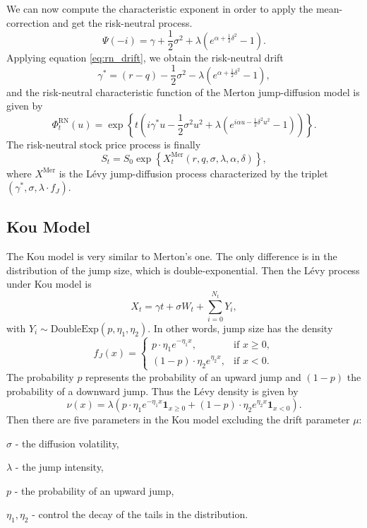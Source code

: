 We can now compute the characteristic exponent in order to apply the mean-correction and get the risk-neutral process.
$$\Psi(-i) = \gamma +\frac{1}{2}\sigma^2 + \lambda\left(e^{\alpha+\frac{1}{2}\delta^2}-1\right).$$
Applying equation \eqref{eq:rn_drift}, we obtain the risk-neutral drift
$$\gamma^\ast = (r-q) -\frac{1}{2}\sigma^2 - \lambda\left(e^{\alpha+\frac{1}{2}\delta^2}-1\right),$$
and the risk-neutral characteristic function of the Merton jump-diffusion model is given by
$$\Phi_t^{\text{RN}}(u) = \exp\left\{t\left(i\gamma^\ast u -\frac{1}{2}\sigma^2 u^2 + \lambda\left(e^{i\alpha u -\frac{1}{2}\delta^2 u^2}-1\right)\right)\right\}.$$
The risk-neutral stock price process is finally
$$S_t = S_0\exp\left\{X_t^\text{Mer}(r,q,\sigma,\lambda,\alpha,\delta)\right\},$$
where $X^\text{Mer}$ is the L\'evy jump-diffusion process characterized by the triplet $(\gamma^\ast,\sigma,\lambda\cdot f_J)$.

\subsection{Kou Model}
The Kou model \citeyearpar{Kou02} is very similar to Merton's one. The only difference is in the distribution of the jump size, which is double-exponential. Then the L\'evy process under Kou model is
$$X_t = \gamma t +\sigma W_t +\sum_{i=0}^{N_t} Y_i,$$
with $Y_i\sim \text{DoubleExp}(p,\eta_1,\eta_2)$. In other words, jump size has the density
$$f_J(x) = \begin{cases}
p\cdot\eta_1e^{-\eta_1 x}, &\text{if } x \geq 0,\\
(1-p)\cdot\eta_2e^{\eta_2x}, &\text{if } x <0.
\end{cases}$$
The probability $p$ represents the probability of an upward jump and $(1-p)$ the probability of a downward jump. Thus the L\'evy density is given by
$$\nu(x) = \lambda\left(p\cdot\eta_1e^{-\eta_1 x} \mathbf{1}_{x\geq0}+(1-p)\cdot\eta_2e^{\eta_2x}\mathbf{1}_{x<0}\right).$$
Then there are five parameters in the Kou model excluding the drift parameter $\mu$:
\begin{my_list_item}
\item $\sigma$ - the diffusion volatility, 
\item $\lambda$ - the jump intensity,
\item $p$ - the probability of an upward jump,
\item $\eta_1, \eta_2$ - control the decay of the tails in the distribution.
\end{my_list_item}
